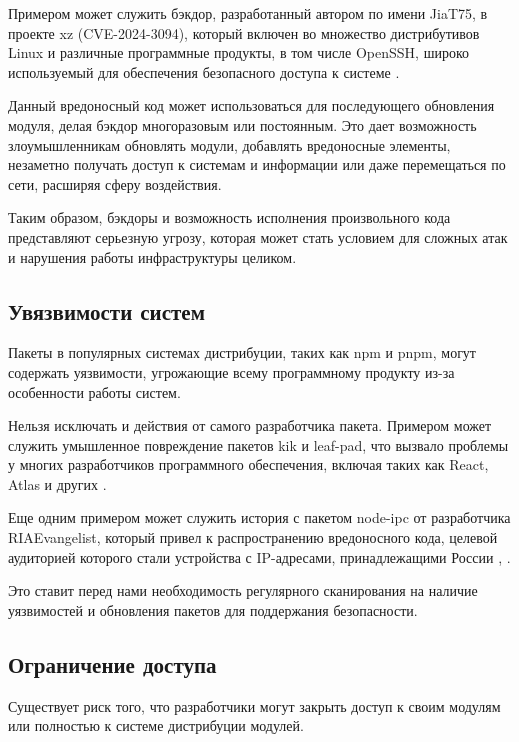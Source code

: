 
Примером может служить бэкдор, разработанный автором по имени JiaT75, в проекте xz (CVE-2024-3094), который включен во множество дистрибутивов Linux и различные программные продукты, в том числе OpenSSH, широко используемый для обеспечения безопасного доступа к системе \cite{risk:xz_backdoor}. 

Данный вредоносный код может использоваться для последующего обновления модуля, делая бэкдор многоразовым или постоянным. Это дает возможность злоумышленникам обновлять модули, добавлять вредоносные элементы, незаметно получать доступ к системам и информации или даже перемещаться по сети, расширяя сферу воздействия.

Таким образом, бэкдоры и возможность исполнения произвольного кода представляют серьезную угрозу, которая может стать условием для сложных атак и нарушения работы инфраструктуры целиком.

\subsection{Увязвимости систем}

Пакеты в популярных системах дистрибуции, таких как npm и pnpm, могут содержать уязвимости, угрожающие всему программному продукту из-за особенности работы систем. 

Нельзя исключать и действия от самого разработчика пакета. Примером может служить умышленное повреждение пакетов kik и leaf-pad, что вызвало проблемы у многих разработчиков программного обеспечения, включая таких как React, Atlas и других \cite{risk:remove-packages}.

Еще одним примером может служить история с пакетом node-ipc от разработчика RIAEvangelist, который привел к распространению вредоносного кода, целевой аудиторией которого стали устройства с IP-адресами, принадлежащими России \cite{risk:node-npc}, \cite{risk:node-npc-2}. 

Это ставит перед нами необходимость регулярного сканирования на наличие уязвимостей и обновления пакетов для поддержания безопасности.

\subsection{Ограничение доступа}

Существует риск того, что разработчики могут закрыть доступ к своим модулям или полностью к системе дистрибуции модулей.

